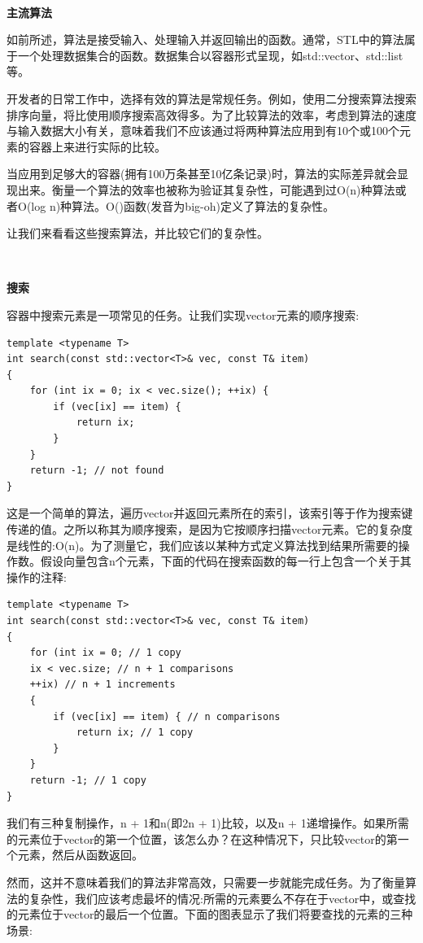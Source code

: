 \noindent\textbf{}\ \par
\textbf{主流算法} \ \par
如前所述，算法是接受输入、处理输入并返回输出的函数。通常，STL中的算法属于一个处理数据集合的函数。数据集合以容器形式呈现，如std::vector、std::list等。 \par
开发者的日常工作中，选择有效的算法是常规任务。例如，使用二分搜索算法搜索排序向量，将比使用顺序搜索高效得多。为了比较算法的效率，考虑到算法的速度与输入数据大小有关，意味着我们不应该通过将两种算法应用到有10个或100个元素的容器上来进行实际的比较。 \par
当应用到足够大的容器(拥有100万条甚至10亿条记录)时，算法的实际差异就会显现出来。衡量一个算法的效率也被称为验证其复杂性，可能遇到过O(n)种算法或者O(log n)种算法。O()函数(发音为big-oh)定义了算法的复杂性。 \par
让我们来看看这些搜索算法，并比较它们的复杂性。 \par

\noindent\textbf{}\ \par
\textbf{搜索} \ \par
容器中搜索元素是一项常见的任务。让我们实现vector元素的顺序搜索: \par

\begin{lstlisting}[caption={}]
template <typename T>
int search(const std::vector<T>& vec, const T& item)
{
	for (int ix = 0; ix < vec.size(); ++ix) {
		if (vec[ix] == item) {
			return ix;
		}
	}
	return -1; // not found
}
\end{lstlisting}

这是一个简单的算法，遍历vector并返回元素所在的索引，该索引等于作为搜索键传递的值。之所以称其为顺序搜索，是因为它按顺序扫描vector元素。它的复杂度是线性的:O(n)。为了测量它，我们应该以某种方式定义算法找到结果所需要的操作数。假设向量包含n个元素，下面的代码在搜索函数的每一行上包含一个关于其操作的注释: \par

\begin{lstlisting}[caption={}]
template <typename T>
int search(const std::vector<T>& vec, const T& item)
{
	for (int ix = 0; // 1 copy
	ix < vec.size; // n + 1 comparisons
	++ix) // n + 1 increments
	{
		if (vec[ix] == item) { // n comparisons
			return ix; // 1 copy
		}
	}
	return -1; // 1 copy
}
\end{lstlisting}

我们有三种复制操作，n + 1和n(即2n + 1)比较，以及n + 1递增操作。如果所需的元素位于vector的第一个位置，该怎么办？在这种情况下，只比较vector的第一个元素，然后从函数返回。 \par
然而，这并不意味着我们的算法非常高效，只需要一步就能完成任务。为了衡量算法的复杂性，我们应该考虑最坏的情况:所需的元素要么不存在于vector中，或查找的元素位于vector的最后一个位置。下面的图表显示了我们将要查找的元素的三种场景: \par

